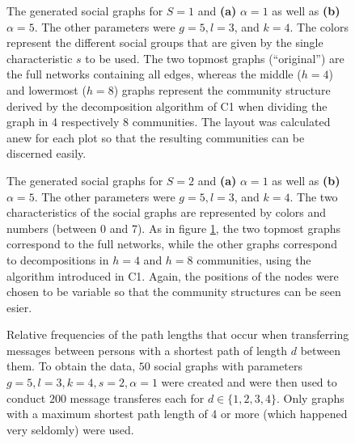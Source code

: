 \documentclass{scrartcl}
\begin{document}
\begin{figure}
    \centering
    \def\svgwidth{0.9\textwidth}
    
    \caption{The generated social graphs for $S=1$ and \textbf{(a)} $\alpha = 1$
    as well as \textbf{(b)} $\alpha = 5$. The other parameters were $g = 5,
    l = 3$, and $k = 4$. The colors represent the different
    social groups that are given by the single characteristic $s$ to be
    used.  The two topmost graphs (\enquote{original}) are the full
    networks containing all edges, whereas the middle ($h = 4$) and
    lowermost ($h=8$) graphs represent the community structure derived by
    the decomposition algorithm of C1 when dividing the graph in
    4 respectively 8 communities.
    The layout was calculated anew for each plot so that the resulting
    communities can be discerned easily.}
    \label{fig:331}
\end{figure}

\begin{figure}
    \centering
    \def\svgwidth{0.9\textwidth}
    
    \caption{The generated social graphs for $S=2$ and \textbf{(a)} $\alpha
    = 1$ as well as \textbf{(b)} $\alpha = 5$. The other parameters were 
    $g = 5, l = 3$, and $k = 4$. The two characteristics of
    the social graphs are represented by colors and numbers (between 0 and
    7).  As in figure \ref{fig:331}, the two topmost graphs correspond to
    the full networks, while the other graphs correspond to decompositions
    in $h = 4$ and $h = 8$ communities, using the algorithm introduced in C1.
    Again, the positions of the nodes were chosen to be variable so that
    the community structures can be seen esier.}
    \label{fig:332}
\end{figure}


\begin{figure}[bcht]
    \centering
    \caption{Relative frequencies of the path lengths that occur when
        transferring messages between persons with a shortest path of
        length $d$ between them. To obtain the data, $50$ social graphs
        with parameters $g = 5, l = 3, k = 4, s = 2, \alpha = 1$ were
        created and were then used to conduct $200$ message transferes each
        for $d\in\{1, 2, 3, 4\}$.  Only graphs with a maximum shortest path
        length of 4 or more (which happened very seldomly) were used. }
    \label{fig:333}
\end{figure}
\end{document}
